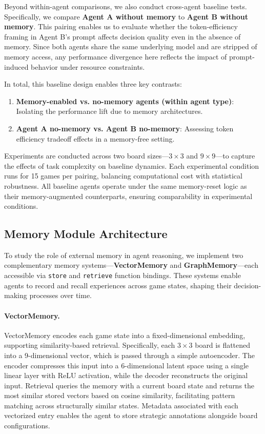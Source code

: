 \documentclass[10pt]{article}
\begin{document}
Beyond within-agent comparisons, we also conduct cross-agent baseline tests. Specifically, we compare \textbf{Agent A without memory} to \textbf{Agent B without memory}. This pairing enables us to evaluate whether the token-efficiency framing in Agent B's prompt affects decision quality even in the absence of memory. Since both agents share the same underlying model and are stripped of memory access, any performance divergence here reflects the impact of prompt-induced behavior under resource constraints.

In total, this baseline design enables three key contrasts:
\begin{enumerate}[leftmargin=*,nosep]
    \item \textbf{Memory-enabled vs. no-memory agents (within agent type)}: Isolating the performance lift due to memory architectures.
    \item \textbf{Agent A no-memory vs. Agent B no-memory}: Assessing token efficiency tradeoff effects in a memory-free setting.
\end{enumerate}

Experiments are conducted across two board sizes—$3 \times 3$ and $9 \times 9$—to capture the effects of task complexity on baseline dynamics. Each experimental condition runs for 15 games per pairing, balancing computational cost with statistical robustness. All baseline agents operate under the same memory-reset logic as their memory-augmented counterparts, ensuring comparability in experimental conditions.

\subsection{Memory Module Architecture}

To study the role of external memory in agent reasoning, we implement two complementary memory systems—\textbf{VectorMemory} and \textbf{GraphMemory}—each accessible via \verb|store| and \verb|retrieve| function bindings. These systems enable agents to record and recall experiences across game states, shaping their decision-making processes over time.

\paragraph{VectorMemory.} 
VectorMemory encodes each game state into a fixed-dimensional embedding, supporting similarity-based retrieval. Specifically, each $3 \times 3$ board is flattened into a 9-dimensional vector, which is passed through a simple autoencoder. The encoder compresses this input into a 6-dimensional latent space using a single linear layer with ReLU activation, while the decoder reconstructs the original input. Retrieval queries the memory with a current board state and returns the most similar stored vectors based on cosine similarity, facilitating pattern matching across structurally similar states. Metadata associated with each vectorized entry enables the agent to store strategic annotations alongside board configurations.
\end{document}
